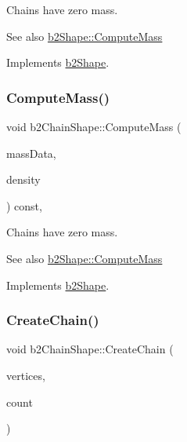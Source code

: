 Chains have zero mass. \begin{DoxySeeAlso}{See also}
\hyperlink{classb2Shape_a61b365526241b47f124789b0309cac69}{b2\+Shape\+::\+Compute\+Mass} 
\end{DoxySeeAlso}


Implements \hyperlink{classb2Shape_a61b365526241b47f124789b0309cac69}{b2\+Shape}.

\mbox{\label{classb2ChainShape_aad3671d6eab61f6b26e2f1b6ac50bb98}} 
\subsubsection{\texorpdfstring{Compute\+Mass()}{ComputeMass()}\hspace{0.1cm}{\footnotesize\ttfamily [2/2]}}
{\footnotesize\ttfamily void b2\+Chain\+Shape\+::\+Compute\+Mass (\begin{DoxyParamCaption}\item[{\hyperlink{structb2MassData}{b2\+Mass\+Data} $\ast$}]{mass\+Data,  }\item[{float32}]{density }\end{DoxyParamCaption}) const\hspace{0.3cm}{\ttfamily [override]}, {\ttfamily [virtual]}}

Chains have zero mass. \begin{DoxySeeAlso}{See also}
\hyperlink{classb2Shape_a61b365526241b47f124789b0309cac69}{b2\+Shape\+::\+Compute\+Mass} 
\end{DoxySeeAlso}


Implements \hyperlink{classb2Shape_a61b365526241b47f124789b0309cac69}{b2\+Shape}.

\mbox{\label{classb2ChainShape_aa0977339b743c05f2179939ccc38e7e0}} 
\subsubsection{\texorpdfstring{Create\+Chain()}{CreateChain()}\hspace{0.1cm}{\footnotesize\ttfamily [1/2]}}
{\footnotesize\ttfamily void b2\+Chain\+Shape\+::\+Create\+Chain (\begin{DoxyParamCaption}\item[{const \hyperlink{structb2Vec2}{b2\+Vec2} $\ast$}]{vertices,  }\item[{int32}]{count }\end{DoxyParamCaption})}

